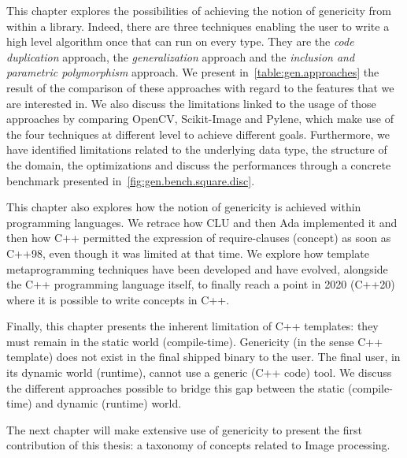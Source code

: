 This chapter explores the possibilities of achieving the notion of genericity from within a library. Indeed, there are
three techniques enabling the user to write a high level algorithm once that can run on every type. They are the
\emph{code duplication} approach, the \emph{generalization} approach and the \emph{inclusion and parametric
  polymorphism} approach. We present in~\cref{table:gen.approaches} the result of the comparison of these approaches with
regard to the features that we are interested in. We also discuss the limitations linked to the usage of those
approaches by comparing OpenCV, Scikit-Image and Pylene, which make use of the four techniques at different level to
achieve different goals. Furthermore, we have identified limitations related to the underlying data type, the structure of the
domain, the optimizations and discuss the performances through a concrete benchmark presented
in~\cref{fig:gen.bench.square.disc}.

This chapter also explores how the notion of genericity is achieved within programming languages. We retrace how CLU and
then Ada implemented it and then how C++ permitted the expression of require-clauses (concept) as soon as C++98, even
though it was limited at that time. We explore how template metaprogramming techniques have been developed and have
evolved, alongside the C++ programming language itself, to finally reach a point in 2020 (C++20) where it is possible to
write concepts in C++.

Finally, this chapter presents the inherent limitation of C++ templates: they must remain in the static world
(compile-time). Genericity (in the sense C++ template) does not exist in the final shipped binary to the user. The final
user, in its dynamic world (runtime), cannot use a generic (C++ code) tool. We discuss the different approaches possible
to bridge this gap between the static (compile-time) and dynamic (runtime) world.

The next chapter will make extensive use of genericity to present the first contribution of this thesis: a taxonomy of
concepts related to Image processing.
